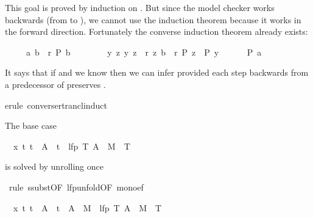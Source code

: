 \begin{isabellebody}
\begin{isamarkuptxt}
\begin{isabelle}
\end{isabelle}
This goal is proved by induction on . But since the model
checker works backwards (from  to ), we cannot use the
induction theorem  because it works in the
forward direction. Fortunately the converse induction theorem
 already exists:
\begin{isabelle}%
\ \ \ \ \ {\isasymlbrakk}{\isacharparenleft}a{\isacharcomma}\ b{\isacharparenright}\ {\isasymin}\ r\isactrlsup {\isacharasterisk}{\isacharsemicolon}\ P\ b{\isacharsemicolon}\isanewline
\ \ \ \ \ \ \ \ {\isasymAnd}y\ z{\isachardot}\ {\isasymlbrakk}{\isacharparenleft}y{\isacharcomma}\ z{\isacharparenright}\ {\isasymin}\ r{\isacharsemicolon}\ {\isacharparenleft}z{\isacharcomma}\ b{\isacharparenright}\ {\isasymin}\ r\isactrlsup {\isacharasterisk}{\isacharsemicolon}\ P\ z{\isasymrbrakk}\ {\isasymLongrightarrow}\ P\ y{\isasymrbrakk}\isanewline
\ \ \ \ \ {\isasymLongrightarrow}\ P\ a%
\end{isabelle}
It says that if  and we know  then we can infer
 provided each step backwards from a predecessor  of
 preserves .%
\end{isamarkuptxt}%
erule\ converse{\isacharunderscore}rtrancl{\isacharunderscore}induct{\isacharparenright}%
\begin{isamarkuptxt}%
\noindent
The base case
\begin{isabelle}%
\ {}{\isachardot}\ {\isasymAnd}x\ t{\isachardot}\ t\ {\isasymin}\ A\ {\isasymLongrightarrow}\ t\ {\isasymin}\ lfp\ {\isacharparenleft}{\isasymlambda}T{\isachardot}\ A\ {\isasymunion}\ M{\isasyminverse}\ {\isacharbackquote}{\isacharbackquote}\ T{\isacharparenright}%
\end{isabelle}
is solved by unrolling  once%
\end{isamarkuptxt}%
\ rule\ ssubst{\isacharbrackleft}OF\ lfp{\isacharunderscore}unfold{\isacharbrackleft}OF\ mono{\isacharunderscore}ef{\isacharbrackright}{\isacharbrackright}{\isacharparenright}%
\begin{isamarkuptxt}%
\begin{isabelle}%
\ {}{\isachardot}\ {\isasymAnd}x\ t{\isachardot}\ t\ {\isasymin}\ A\ {\isasymLongrightarrow}\ t\ {\isasymin}\ A\ {\isasymunion}\ M{\isasyminverse}\ {\isacharbackquote}{\isacharbackquote}\ lfp\ {\isacharparenleft}{\isasymlambda}T{\isachardot}\ A\ {\isasymunion}\ M{\isasyminverse}\ {\isacharbackquote}{\isacharbackquote}\ T{\isacharparenright}%

\end{isabelle}
\end{isamarkuptxt}
\end{isabellebody}
